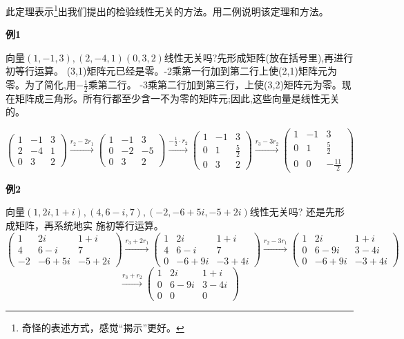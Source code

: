 此定理表示\footnote{奇怪的表述方式，感觉“揭示”更好。}出我们提出的检验线性无关的方法。用二例说明该定理和方法。

\textbf{例1}

向量$(1,-1,3),(2,-4,1)(0,3,2)$线性无关吗?先形成矩阵(放在括号里),再进行初等行运算。
(3,1)矩阵元已经是零。-2乘第一行加到第二行上使(2,1)矩阵元为零。为了简化,用$-\frac{1}{2}$乘第二行。
-3乘第二行加到第三行，上使(3,2)矩阵元为零。现在矩阵成三角形。所有行都至少含一不为零的矩阵元;因此,这些向量是线性无关的。

\[
\begin{pmatrix}
    1 & -1 & 3 \\
    2 & -4 & 1 \\
    0 & 3 & 2
\end{pmatrix}    
\xrightarrow{r_2-2r_1}
\begin{pmatrix}
    1 & -1 & 3 \\
    0 & -2 & -5 \\
    0 & 3 & 2
\end{pmatrix} 
\xrightarrow{-\frac{1}{2} \cdot r_2}
\begin{pmatrix}
    1 & -1 & 3 \\
    0 & 1 & \frac{5}{2} \\
    0 & 3 & 2
\end{pmatrix} 
\xrightarrow{r_3-3r_2}
\begin{pmatrix}
    1 & -1 & 3 \\
    0 & 1 & \frac{5}{2} \\
    0 & 0 & -\frac{11}{2}
\end{pmatrix} 
\]

\textbf{例2}

向量$(1,2i,1+i),(4,6-i,7),(-2,-6+5i,-5+2i)$线性无关吗?
还是先形成矩阵，再系统地实 施初等行运算。
\[
\begin{pmatrix}
    1 & 2i & 1+i \\
    4 & 6-i & 7 \\
    -2 & -6+5i & -5+2i
\end{pmatrix}    
\xrightarrow{r_3+2r_1}
\begin{pmatrix}
    1 & 2i & 1+i \\
    4 & 6-i & 7 \\
    0 & -6+9i & -3+4i
\end{pmatrix}    
\xrightarrow{r_2-3r_1}
\begin{pmatrix}
    1 & 2i & 1+i \\
    0 & 6-9i & 3-4i \\
    0 & -6+9i & -3+4i
\end{pmatrix}
\]
\[
\xrightarrow{r_3+r_2}
\begin{pmatrix}
    1 & 2i & 1+i \\
    0 & 6-9i & 3-4i \\
    0 & 0 & 0
\end{pmatrix}
\]

